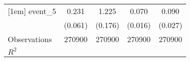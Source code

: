 {\begin{tabular}{l*{4}{c}}
[1em]
event\_5             &       0.231\sym{***}&       1.225\sym{***}&       0.070\sym{***}&       0.090\sym{***}\\
                    &     (0.061)         &     (0.176)         &     (0.016)         &     (0.027)         \\
\hline
Observations        &      270900         &      270900         &      270900         &      270900         \\
\(R^{2}\)           &                     &                     &                     &                     \\
\hline\hline
\end{tabular}
}

